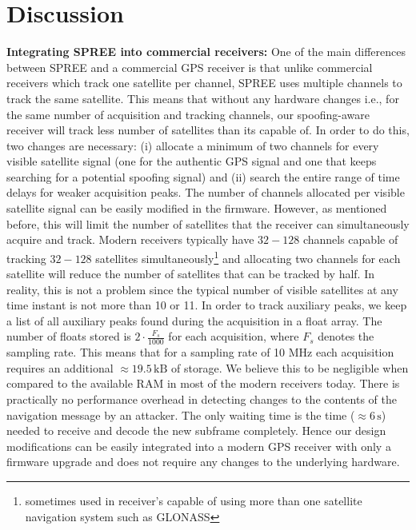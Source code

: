\documentclass[letterpaper,twocolumn,10pt]{article}
\newcommand{\ie}{i.e.,\xspace}
\newcommand{\unit}[1]{\ensuremath{\, \mathrm{#1}}}
\newcommand{\rxname}{SPREE\xspace}
\begin{document}
\section{Discussion}
\label{sec:gps_discussion}
\noindent\textbf{Integrating \rxname into commercial receivers:} One of the main differences between \rxname and a commercial GPS receiver is that unlike commercial receivers which track one satellite per channel, \rxname uses multiple channels to track the same satellite. This means that without any hardware changes \ie for the same number of acquisition and tracking channels, our spoofing-aware receiver will track less number of satellites than its capable of. In order to do this, two changes are necessary: (i) allocate a minimum of two channels for every visible satellite signal (one for the authentic GPS signal and one that keeps searching for a potential spoofing signal) and (ii) search the entire range of time delays for weaker acquisition peaks. The number of channels allocated per visible satellite signal can be easily modified in the firmware. However, as mentioned before, this will limit the number of satellites that the receiver can simultaneously acquire and track. Modern receivers typically have $32-128$ channels capable of tracking $32-128$ satellites simultaneously\footnote{sometimes used in receiver's capable of using more than one satellite navigation system such as GLONASS} and allocating two channels for each satellite will reduce the number of satellites that can be tracked by half. In reality, this is not a problem since the typical number of visible satellites at any time instant is not more than 10 or 11. In order to track auxiliary peaks, we keep a list of all auxiliary peaks found during the acquisition in a float array. The number of floats stored is $2 \cdot \frac{F_s}{1000}$ for each acquisition, where $F_s$ denotes the sampling rate. This means that for a sampling rate of 10 MHz each acquisition requires an additional $\approx 19.5\unit{kB}$ of storage. We believe this to be negligible when compared to the available RAM in most of the modern receivers today. There is practically no performance overhead in detecting changes to the contents of the navigation message by an attacker. The only waiting time is the time ($\approx 6 \unit{s}$) needed to receive and decode the new subframe completely. Hence our design modifications can be easily integrated into a modern GPS receiver with only a firmware upgrade and does not require any changes to the underlying hardware.\\
\end{document}
